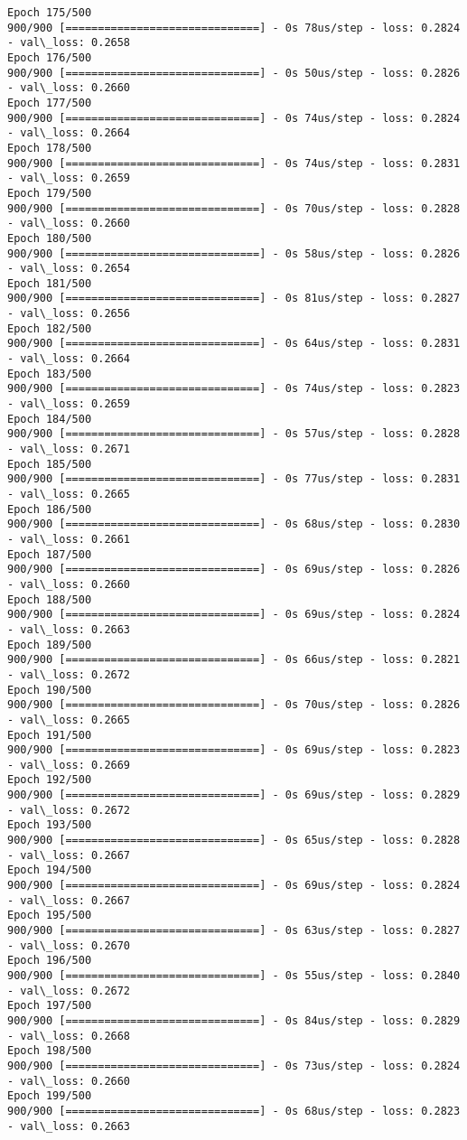 \documentclass[11pt]{article}
\begin{document}
\begin{Verbatim}[commandchars=\\\{\}]
Epoch 175/500
900/900 [==============================] - 0s 78us/step - loss: 0.2824 - val\_loss: 0.2658
Epoch 176/500
900/900 [==============================] - 0s 50us/step - loss: 0.2826 - val\_loss: 0.2660
Epoch 177/500
900/900 [==============================] - 0s 74us/step - loss: 0.2824 - val\_loss: 0.2664
Epoch 178/500
900/900 [==============================] - 0s 74us/step - loss: 0.2831 - val\_loss: 0.2659
Epoch 179/500
900/900 [==============================] - 0s 70us/step - loss: 0.2828 - val\_loss: 0.2660
Epoch 180/500
900/900 [==============================] - 0s 58us/step - loss: 0.2826 - val\_loss: 0.2654
Epoch 181/500
900/900 [==============================] - 0s 81us/step - loss: 0.2827 - val\_loss: 0.2656
Epoch 182/500
900/900 [==============================] - 0s 64us/step - loss: 0.2831 - val\_loss: 0.2664
Epoch 183/500
900/900 [==============================] - 0s 74us/step - loss: 0.2823 - val\_loss: 0.2659
Epoch 184/500
900/900 [==============================] - 0s 57us/step - loss: 0.2828 - val\_loss: 0.2671
Epoch 185/500
900/900 [==============================] - 0s 77us/step - loss: 0.2831 - val\_loss: 0.2665
Epoch 186/500
900/900 [==============================] - 0s 68us/step - loss: 0.2830 - val\_loss: 0.2661
Epoch 187/500
900/900 [==============================] - 0s 69us/step - loss: 0.2826 - val\_loss: 0.2660
Epoch 188/500
900/900 [==============================] - 0s 69us/step - loss: 0.2824 - val\_loss: 0.2663
Epoch 189/500
900/900 [==============================] - 0s 66us/step - loss: 0.2821 - val\_loss: 0.2672
Epoch 190/500
900/900 [==============================] - 0s 70us/step - loss: 0.2826 - val\_loss: 0.2665
Epoch 191/500
900/900 [==============================] - 0s 69us/step - loss: 0.2823 - val\_loss: 0.2669
Epoch 192/500
900/900 [==============================] - 0s 69us/step - loss: 0.2829 - val\_loss: 0.2672
Epoch 193/500
900/900 [==============================] - 0s 65us/step - loss: 0.2828 - val\_loss: 0.2667
Epoch 194/500
900/900 [==============================] - 0s 69us/step - loss: 0.2824 - val\_loss: 0.2667
Epoch 195/500
900/900 [==============================] - 0s 63us/step - loss: 0.2827 - val\_loss: 0.2670
Epoch 196/500
900/900 [==============================] - 0s 55us/step - loss: 0.2840 - val\_loss: 0.2672
Epoch 197/500
900/900 [==============================] - 0s 84us/step - loss: 0.2829 - val\_loss: 0.2668
Epoch 198/500
900/900 [==============================] - 0s 73us/step - loss: 0.2824 - val\_loss: 0.2660
Epoch 199/500
900/900 [==============================] - 0s 68us/step - loss: 0.2823 - val\_loss: 0.2663

\end{Verbatim}
\end{document}
